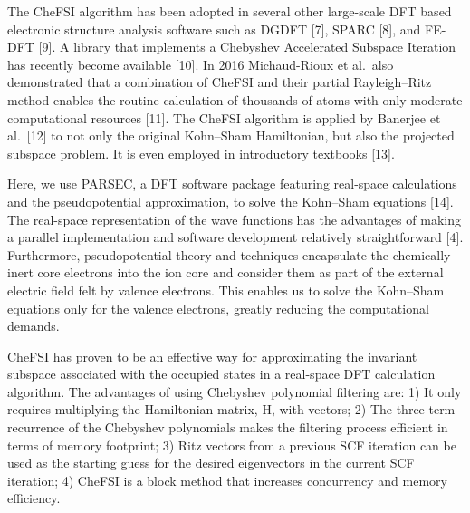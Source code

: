 \documentclass[
  10
]{article}
\begin{document}
The CheFSI algorithm has been adopted in several other large-scale DFT
based electronic structure analysis software such as DGDFT {[}7{]},
SPARC {[}8{]}, and FE-DFT {[}9{]}. A library that implements a Chebyshev
Accelerated Subspace Iteration has recently become available {[}10{]}.
In 2016 Michaud-Rioux et al.~also demonstrated that a combination of
CheFSI and their partial Rayleigh--Ritz method enables the routine
calculation of thousands of atoms with only moderate computational
resources {[}11{]}. The CheFSI algorithm is applied by Banerjee et
al.~{[}12{]} to not only the original Kohn--Sham Hamiltonian, but also
the projected subspace problem. It is even employed in introductory
textbooks {[}13{]}.

Here, we use PARSEC, a DFT software package featuring real-space
calculations and the pseudopotential approximation, to solve the
Kohn--Sham equations {[}14{]}. The real-space representation of the wave
functions has the advantages of making a parallel implementation and
software development relatively straightforward {[}4{]}. Furthermore,
pseudopotential theory and techniques encapsulate the chemically inert
core electrons into the ion core and consider them as part of the
external electric field felt by valence electrons. This enables us to
solve the Kohn--Sham equations only for the valence electrons, greatly
reducing the computational demands.

CheFSI has proven to be an effective way for approximating the invariant
subspace associated with the occupied states in a real-space DFT
calculation algorithm. The advantages of using Chebyshev polynomial
filtering are: 1) It only requires multiplying the Hamiltonian matrix,
H, with vectors; 2) The three-term recurrence of the Chebyshev
polynomials makes the filtering process efficient in terms of memory
footprint; 3) Ritz vectors from a previous SCF iteration can be used as
the starting guess for the desired eigenvectors in the current SCF
iteration; 4) CheFSI is a block method that increases concurrency and
memory efficiency.
\end{document}
